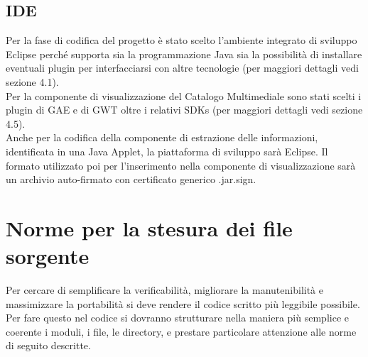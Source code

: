 \subsection{IDE}
Per la fase di codifica del progetto \`e stato scelto l'ambiente
integrato di sviluppo Eclipse perch\'e supporta sia la programmazione Java
sia la possibilit\`a  di installare eventuali plugin per interfacciarsi con
altre tecnologie (per maggiori dettagli vedi sezione 4.1).\\
Per la componente di visualizzazione del Catalogo
Multimediale sono stati scelti i plugin di GAE e di GWT oltre i relativi SDKs
(per maggiori dettagli vedi sezione 4.5).\\ 
Anche per la codifica della componente di estrazione delle informazioni,
identificata in una Java Applet, la piattaforma di sviluppo sar\`a Eclipse. Il
formato utilizzato poi per l'inserimento nella componente di visualizzazione
sar\`a un archivio auto-firmato con certificato generico .jar.sign.

\section{Norme per la stesura dei file sorgente}
Per cercare di semplificare la verificabilit\`a,
migliorare la manutenibilit\`a e massimizzare la portabilit\`a si deve rendere il codice scritto pi\`u leggibile possibile.\\
Per fare questo nel codice si dovranno strutturare nella maniera pi\`u semplice e coerente i moduli, i
file, le directory, e prestare particolare attenzione alle norme di seguito
descritte.


